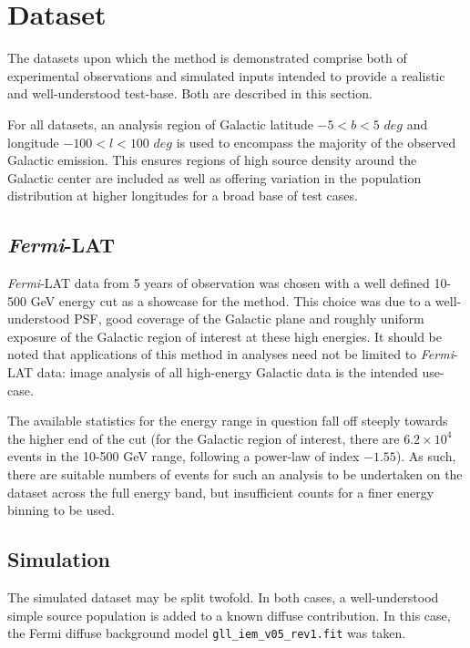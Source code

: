 \documentclass{PoS}
\begin{document}
\section{Dataset}

The datasets upon which the method is demonstrated comprise both of experimental observations and simulated inputs intended to provide a realistic and well-understood test-base. Both are described in this section.

For all datasets, an analysis region of Galactic latitude $-5 < b < 5$ $deg$ and longitude $-100 < l < 100$ $deg$ is used to encompass the majority of the observed Galactic emission. This ensures regions of high source density around the Galactic center are included as well as offering variation in the population distribution at higher longitudes for a broad base of test cases.


\subsection{\textit{Fermi}-LAT}

\textit{Fermi}-LAT data from 5 years of observation was chosen with a well defined 10-500 GeV energy cut as a showcase for the method. This choice was due to a well-understood PSF, good coverage of the Galactic plane and roughly uniform exposure of the Galactic region of interest at these high energies. It should be noted that applications of this method in analyses need not be limited to \textit{Fermi}-LAT data: image analysis of all high-energy Galactic data is the intended use-case.

The available statistics for the energy range in question fall off steeply towards the higher end of the cut (for the Galactic region of interest, there are $6.2 \times 10^4$ events in the 10-500 GeV range, following a power-law of index $-1.55$). As such, there are suitable numbers of events for such an analysis to be undertaken on the dataset across the full energy band, but insufficient counts for a finer energy binning to be used.

\subsection{Simulation}

The simulated dataset may be split twofold. In both cases, a well-understood simple source population is added to a known diffuse contribution. In this case, the Fermi diffuse background model \verb|gll_iem_v05_rev1.fit| was taken.
\end{document}
